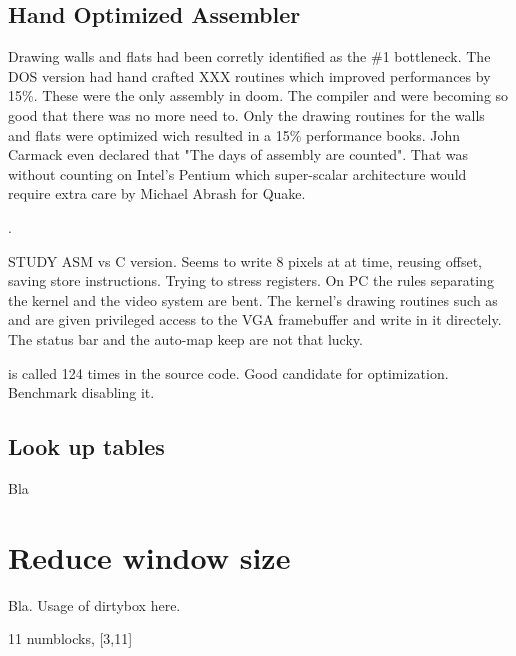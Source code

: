 \subsection{Hand Optimized Assembler}
Drawing walls and flats had been corretly identified as the \#1 bottleneck. The DOS version had hand crafted XXX routines which improved performances by 15\%. These were the only assembly in doom. The compiler and  were becoming so good that there was no more need to. Only the drawing routines for the walls and flats were optimized wich resulted in a 15\% performance books. John Carmack even declared that "The days of assembly are counted". That was without counting on Intel's Pentium which super-scalar architecture would require extra care by Michael Abrash for Quake.\\
\par
 .
 \par
 STUDY ASM vs C version. Seems to write 8 pixels at at time, reusing offset, saving store instructions. Trying to stress registers. On PC the rules separating the kernel and the video system are bent. The kernel's drawing routines such as  and  are given privileged access to the VGA framebuffer and write in it directely. The status bar and the auto-map keep are not that lucky.\\
 \par
  is called 124 times in the source code. Good candidate for optimization. Benchmark disabling it.
 \par

\subsection{Look up tables}
Bla
\section{Reduce window size}
Bla. Usage of dirtybox here.
\par
{}
\par
11 numblocks, [3,11]\\
\par
{}
\par


